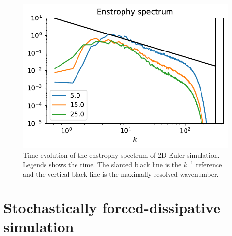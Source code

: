 \begin{figure}
    \centering
    \includegraphics{2DEuler_spec}
    \caption{Time evolution of the enstrophy spectrum of 2D Euler simulation. Legends shows the time. The slanted black line is the $k^{-1}$ reference and the vertical black line is the maximally resolved wavenumber.}
    \label{fig:2DEuler_spec}
\end{figure}


\section{Stochastically forced-dissipative simulation}

